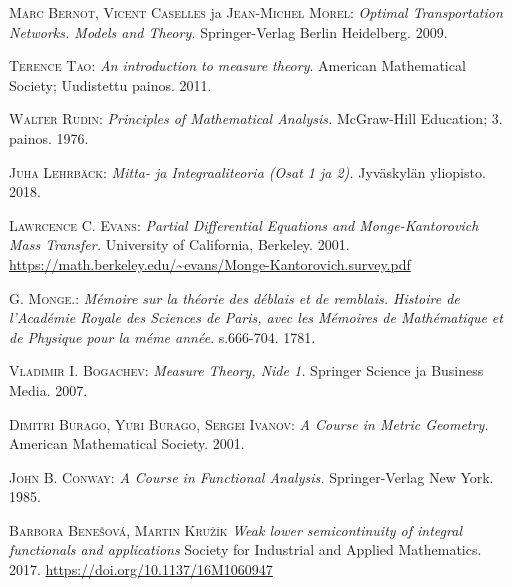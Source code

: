 
\appendix
\backmatter
\begin{thebibliography}{30}


\textsc{Marc Bernot}, \textsc{Vicent Caselles} ja \textsc{Jean-Michel Morel}:
\textit{Optimal Transportation Networks. Models and Theory.}
Springer-Verlag Berlin Heidelberg. 2009.

\textsc{Terence Tao}:
\textit{An introduction to measure theory}.
American Mathematical Society; Uudistettu painos. 2011.

\textsc{Walter Rudin}:
\textit{Principles of Mathematical Analysis.}
McGraw-Hill Education; 3. painos. 1976.

\textsc{Juha Lehrbäck}:
\textit{Mitta- ja Integraaliteoria (Osat 1 ja 2).}
{Jyväskylän yliopisto.} 2018.

\textsc{Lawrcence C. Evans}:
\textit{Partial Differential Equations and Monge-Kantorovich Mass Transfer.}
{University of California, Berkeley.} 2001.
\url{https://math.berkeley.edu/~evans/Monge-Kantorovich.survey.pdf}

\textsc{G. Monge.}:
\textit{Mémoire sur la théorie des déblais et de remblais. Histoire de l’Académie Royale des Sciences de Paris, avec les Mémoires de Mathématique et de Physique pour la méme année}. s.666-704. 1781.

\textsc{Vladimir I. Bogachev}:
\textit{Measure Theory, Nide 1.}
{Springer Science ja Business Media.} 2007.

\textsc{Dimitri Burago, Yuri Burago, Sergei Ivanov}:
\textit{A Course in Metric Geometry.}
{American Mathematical Society.} 2001.

\textsc{John B. Conway}:
\textit{A Course in Functional Analysis.}
{Springer-Verlag New York.} 1985.

\textsc{Barbora Benešová, Martin Kružík}
\textit{Weak lower semicontinuity of integral functionals and applications}
{Society for Industrial and Applied Mathematics.} 2017. 
\url{https://doi.org/10.1137/16M1060947}


\end{thebibliography}
